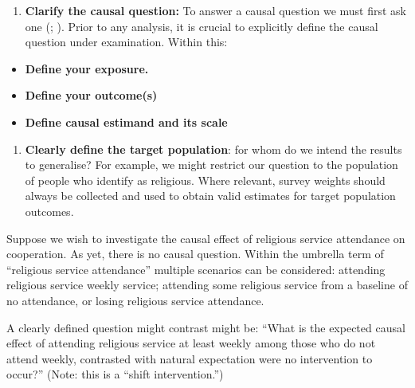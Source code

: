 \documentclass[
  singlecolumn]{article}
\providecommand{\tightlist}{%
  \setlength{\itemsep}{0pt}\setlength{\parskip}{0pt}}\usepackage{longtable,booktabs,array}
\begin{document}
\begin{enumerate}
\def\labelenumi{\arabic{enumi}.}
\tightlist
\item
  \textbf{Clarify the causal question:} To answer a causal question we
  must first ask one (;
  ). Prior to any
  analysis, it is crucial to explicitly define the causal question under
  examination. Within this:
\end{enumerate}

\begin{itemize}
\tightlist
\item
  \textbf{Define your exposure.}
\item
  \textbf{Define your outcome(s)}
\item
  \textbf{Define causal estimand and its scale}
\end{itemize}

\begin{enumerate}
\def\labelenumi{\arabic{enumi}.}
\setcounter{enumi}{1}
\tightlist
\item
  \textbf{Clearly define the target population}: for whom do we intend
  the results to generalise? For example, we might restrict our question
  to the population of people who identify as religious. Where relevant,
  survey weights should always be collected and used to obtain valid
  estimates for target population outcomes.
\end{enumerate}

Suppose we wish to investigate the causal effect of religious service
attendance on cooperation. As yet, there is no causal question. Within
the umbrella term of ``religious service attendance'' multiple scenarios
can be considered: attending religious service weekly service; attending
some religious service from a baseline of no attendance, or losing
religious service attendance.

A clearly defined question might contrast might be: ``What is the
expected causal effect of attending religious service at least weekly
among those who do not attend weekly, contrasted with natural
expectation were no intervention to occur?'' (Note: this is a ``shift
intervention.'')
\end{document}
